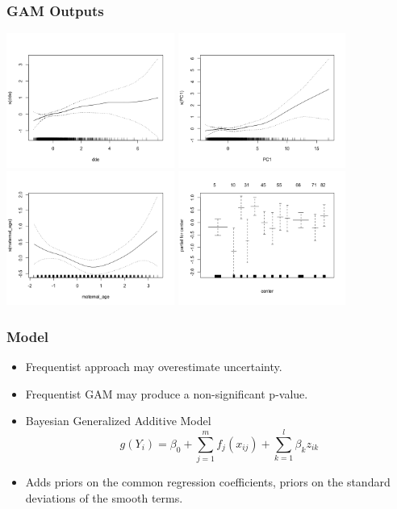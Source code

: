 \documentclass{beamer}
\begin{document}
\begin{frame}
\frametitle{GAM Outputs}
   \begin{minipage}{1\textwidth}
    \includegraphics[width=55mm]{GAMPlotdde.png}
    \hfill
    \includegraphics[width=55mm]{GAMPlotPC1.png}
    \vspace{0.5cm}
    \includegraphics[width=55mm]{GAMPlotMaternalAge.png}
    \hfill
    \includegraphics[width=55mm]{GAMPlotCenter.png}
  \end{minipage}
\end{frame}

\begin{frame}
\frametitle{Model}

\begin{itemize}

\item Frequentist approach may overestimate uncertainty.
\item Frequentist GAM may produce a non-significant p-value.
\pause
\item Bayesian Generalized Additive Model
$$g(Y_i) = \beta_0 + \sum_{j=1}^m f_j(x_{ij}) + \sum_{k=1}^l \beta_{k}z_{ik}$$

\item Adds priors on the common regression coefficients, priors on the standard deviations of the smooth terms.


\end{itemize}
\end{frame}
\end{document}
